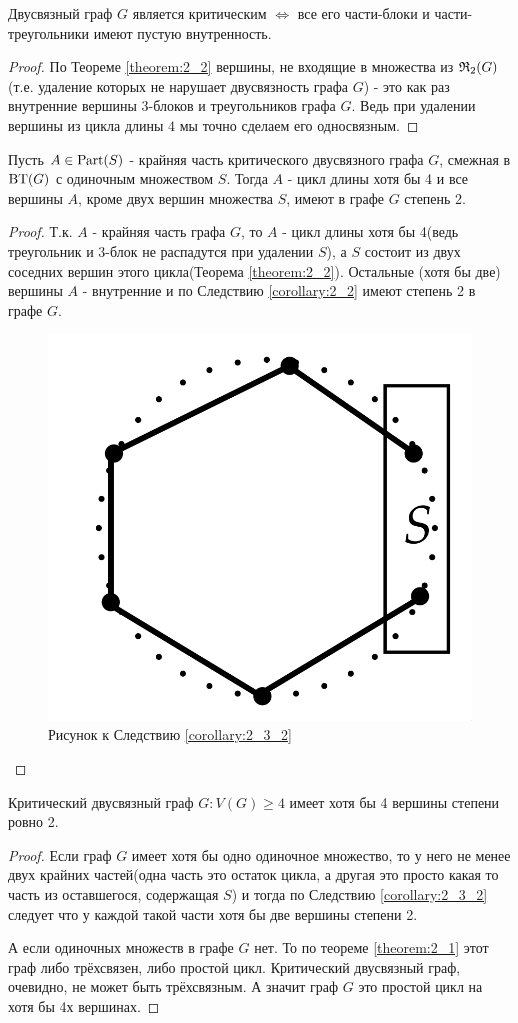 \begin{crly}[Следствие 2.3] \label{corollary:2_3_1}
	Двусвязный граф $G$ является критическим  $\iff$ все его части-блоки и части-треугольники имеют пустую внутренность.
\end{crly}

\begin{proof}
	По Теореме \ref{theorem:2_2} вершины, не входящие в множества из $\mathfrak{R}_2(G)$(т.е. удаление которых не нарушает двусвязность графа $G$) - это как раз внутренние вершины 3-блоков и треугольников графа $G$.
	Ведь при удалении вершины из цикла длины  $4$ мы точно сделаем его односвязным. 
\end{proof}

\begin{crly}[Следствие 2.3] \label{corollary:2_3_2}
	Пусть $A \in \operatorname{Part}(S)$ - крайняя часть критического двусвязного графа $G$, смежная в $\operatorname{BT}(G)$ с одиночным множеством  $S$.
	Тогда  $A$ - цикл длины хотя бы 4 и все вершины  $A$, кроме двух вершин множества  $S$, имеют в графе  $G$ степень 2.
\end{crly}

\begin{proof}
	Т.к. $A$ - крайняя часть графа  $G$, то  $A$ - цикл длины хотя бы 4(ведь треугольник и 3-блок не распадутся при удалении $S$), а  $S$ состоит из двух соседних вершин этого цикла(Теорема \ref{theorem:2_2}).
	Остальные (хотя бы две) вершины $A$ - внутренние и по Следствию \ref{corollary:2_2} имеют степень 2 в графе  $G$.

\begin{figure}[ht]
    \centering
	\includegraphics[width=0.2\columnwidth]{figures/corollary_2_3_2.png}
    \caption{Рисунок к Следствию \ref{corollary:2_3_2}}
    \label{fig:corollary_2_3_2}
\end{figure}

\end{proof}

\begin{crly} \label{corollary:2_4}
	Критический двусвязный граф $G : V(G) \geqslant 4$ имеет хотя бы 4 вершины степени ровно 2.
\end{crly}

\begin{proof}
	Если граф $G$ имеет хотя бы одно одиночное множество, то у него не менее двух крайних частей(одна часть это остаток цикла, а другая это просто какая то часть из оставшегося, содержащая $S$) и тогда по Следствию \ref{corollary:2_3_2} следует что у каждой такой части хотя бы две вершины степени 2.

	А если одиночных множеств в графе $G$ нет. То по теореме \ref{theorem:2_1} этот граф либо трёхсвязен, либо простой цикл.
	Критический двусвязный граф, очевидно, не может быть трёхсвязным.
	А значит граф  $G$ это простой цикл на хотя бы 4х вершинах.
\end{proof}

